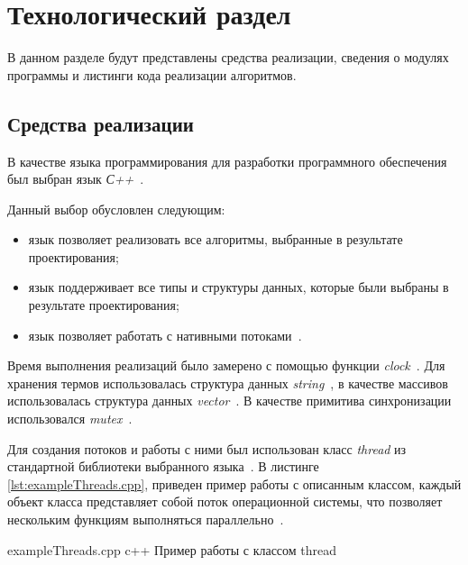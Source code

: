 \chapter{Технологический раздел}

В данном разделе будут представлены средства реализации, сведения о модулях программы и листинги кода реализации алгоритмов.


\section{Средства реализации}

В качестве языка программирования для разработки программного обеспечения был выбран язык \textit{С++}~\cite{cpp}.

Данный выбор обусловлен следующим: 
\begin{itemize}
	\item язык позволяет реализовать все алгоритмы, выбранные в результате
	проектирования;
	\item язык поддерживает все типы и структуры данных, которые были выбраны в результате проектирования;
	\item язык позволяет работать с нативными потоками~\cite{thread}.
\end{itemize}


Время выполнения реализаций было замерено с помощью функции \textit{clock}~\cite{clock}. 
Для хранения термов использовалась структура данных \textit{string}~\cite{wstring}, в качестве массивов использовалась структура данных \textit{vector}~\cite{vector}.
В качестве примитива синхронизации использовался \textit{mutex}~\cite{mutex}.

Для создания потоков и работы с ними был использован класс \textit{thread} из стандартной библиотеки выбранного языка~\cite{thread}.
В листинге \ref{lst:exampleThreads.cpp}, приведен пример работы с описанным классом, каждый объект класса представляет собой поток операционной системы, что позволяет нескольким функциям выполняться параллельно~\cite{thread}. 

\clearpage
{}
{exampleThreads.cpp} %
{c++} %
{Пример работы с классом thread} %



